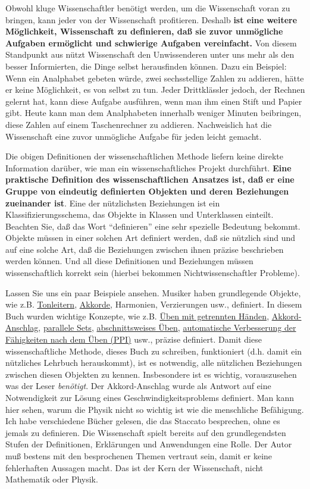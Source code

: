 Obwohl kluge Wissenschaftler benötigt werden, um die Wissenschaft voran zu bringen, kann jeder von der Wissenschaft profitieren.
Deshalb \textbf{ist eine weitere Möglichkeit, Wissenschaft zu definieren, daß sie zuvor unmögliche Aufgaben ermöglicht und schwierige Aufgaben vereinfacht.}
Von diesem Standpunkt aus nützt Wissenschaft den Unwissenderen unter uns mehr als den besser Informierten, die Dinge selbst herausfinden können.
Dazu ein Beispiel: Wenn ein Analphabet gebeten würde, zwei sechsstellige Zahlen zu addieren, hätte er keine Möglichkeit, es von selbst zu tun.
Jeder Drittklässler jedoch, der Rechnen gelernt hat, kann diese Aufgabe ausführen, wenn man ihm einen Stift und Papier gibt.
Heute kann man dem Analphabeten innerhalb weniger Minuten beibringen, diese Zahlen auf einem Taschenrechner zu addieren.
Nachweislich hat die Wissenschaft eine zuvor unmögliche Aufgabe für jeden leicht gemacht.

Die obigen Definitionen der wissenschaftlichen Methode liefern keine direkte Information darüber, wie man ein wissenschaftliches Projekt durchführt.
\textbf{Eine praktische Definition des wissenschaftlichen Ansatzes ist, daß er eine Gruppe von eindeutig definierten Objekten und deren Beziehungen zueinander ist}.
Eine der nützlichsten Beziehungen ist ein Klassifizierungsschema, das Objekte in Klassen und Unterklassen einteilt.
Beachten Sie, daß das Wort \enquote{definieren} eine sehr spezielle Bedeutung bekommt.
Objekte müssen in einer solchen Art definiert werden, daß sie nützlich sind und auf eine solche Art, daß die Beziehungen zwischen ihnen präzise beschrieben werden können.
Und all diese Definitionen und Beziehungen müssen wissenschaftlich korrekt sein (hierbei bekommen Nichtwissenschaftler Probleme).

Lassen Sie uns ein paar Beispiele ansehen.
Musiker haben grundlegende Objekte, wie z.B. \hyperref[c1iii5a]{Tonleitern}, \hyperref[c1iii7e]{Akkorde}, Harmonien, Verzierungen usw., definiert.
In diesem Buch wurden wichtige Konzepte, wie z.B. \hyperref[c1ii7]{Üben mit getrennten Händen}, \hyperref[c1ii9]{Akkord-Anschlag}, \hyperref[c1ii11]{parallele Sets}, \hyperref[c1ii5]{abschnittsweises Üben}, \hyperref[c1ii15]{automatische Verbesserung der Fähigkeiten nach dem Üben (PPI)} usw., präzise definiert.
Damit diese wissenschaftliche Methode, dieses Buch zu schreiben, funktioniert (d.h. damit ein nützliches Lehrbuch herauskommt), ist es notwendig, alle nützlichen Beziehungen zwischen diesen Objekten zu kennen.
Insbesondere ist es wichtig, vorauszusehen was der Leser \textit{benötigt}.
Der Akkord-Anschlag wurde als Antwort auf eine Notwendigkeit zur Lösung eines Geschwindigkeitsproblems definiert.
Man kann hier sehen, warum die Physik nicht so wichtig ist wie die menschliche Befähigung.
Ich habe verschiedene Bücher gelesen, die das Staccato besprechen, ohne es jemals zu definieren.
Die Wissenschaft spielt bereits auf den grundlegendsten Stufen der Definitionen, Erklärungen und Anwendungen eine Rolle.
Der Autor muß bestens mit den besprochenen Themen vertraut sein, damit er keine fehlerhaften Aussagen macht.
Das ist der Kern der Wissenschaft, nicht Mathematik oder Physik.

